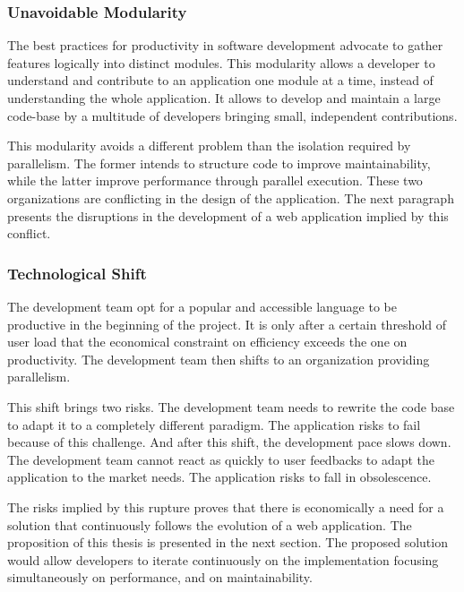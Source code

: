\subsubsection{Unavoidable Modularity}

The best practices for productivity in software development advocate to gather features logically into distinct modules.
This modularity allows a developer to understand and contribute to an application one module at a time, instead of understanding the whole application.
It allows to develop and maintain a large code-base by a multitude of developers bringing small, independent contributions.

This modularity avoids a different problem than the isolation required by parallelism.
The former intends to structure code to improve maintainability, while the latter improve performance through parallel execution.
These two organizations are conflicting in the design of the application.
The next paragraph presents the disruptions in the development of a web application implied by this conflict.

\subsubsection{Technological Shift}

The development team opt for a popular and accessible language to be productive in the beginning of the project. %
It is only after a certain threshold of user load that the economical constraint on efficiency exceeds the one on productivity.
The development team then shifts to an organization providing parallelism.

This shift brings two risks.
The development team needs to rewrite the code base to adapt it to a completely different paradigm.
The application risks to fail because of this challenge.
And after this shift, the development pace slows down.
The development team cannot react as quickly to user feedbacks to adapt the application to the market needs.
The application risks to fall in obsolescence.

The risks implied by this rupture proves that there is economically a need for a solution that continuously follows the evolution of a web application.
The proposition of this thesis is presented in the next section.
The proposed solution would allow developers to iterate continuously on the implementation focusing simultaneously on performance, and on maintainability.

